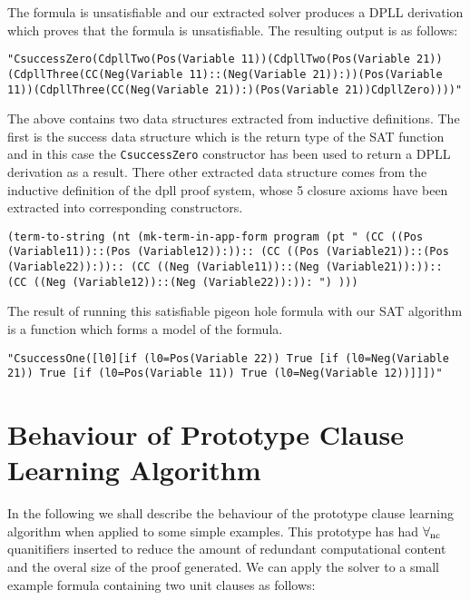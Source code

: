 The formula is unsatisfiable and our extracted solver produces a DPLL derivation which proves that the formula is unsatisfiable. The resulting output is as follows:

\begin{center}
\texttt{"CsuccessZero(CdpllTwo(Pos(Variable 11))(CdpllTwo(Pos(Variable 21))(CdpllThree(CC(Neg(Variable 11)::(Neg(Variable 21)):))(Pos(Variable 11))(CdpllThree(CC(Neg(Variable 21)):)(Pos(Variable 21))CdpllZero))))"}
\end{center}

The above contains two data structures extracted from inductive definitions. The first is the success data structure which is the return type of the SAT function and in this case the \texttt{CsuccessZero} constructor has been used to return a DPLL derivation as a result. There other extracted data structure comes from the inductive definition of the dpll proof system, whose 5 closure axioms have been extracted into corresponding constructors.



\begin{center}
\texttt{(term-to-string (nt (mk-term-in-app-form program (pt "                          
(CC ((Pos (Variable11))::(Pos (Variable12)):))::                                
(CC ((Pos (Variable21))::(Pos (Variable22)):))::                                
(CC ((Neg (Variable11))::(Neg (Variable21)):))::                                
(CC ((Neg (Variable12))::(Neg (Variable22)):)):                                 
") )))}
\end{center}

The result of running this satisfiable pigeon hole formula with our SAT algorithm is a function which forms a model of the formula.

\begin{center}
\texttt{"CsuccessOne([l0][if (l0=Pos(Variable 22)) True [if (l0=Neg(Variable 21)) True [if (l0=Pos(Variable 11)) True (l0=Neg(Variable 12))]]])"}
\end{center}


\section{Behaviour of Prototype Clause Learning Algorithm}
In the following we shall describe the behaviour of the prototype clause learning algorithm when applied to some simple examples. This prototype has had $\forall_{\mathrm{nc}}$ quanitifiers inserted to reduce the amount of redundant computational content and the overal size of the proof generated. We can apply the solver to a small example formula containing two unit clauses as follows:

